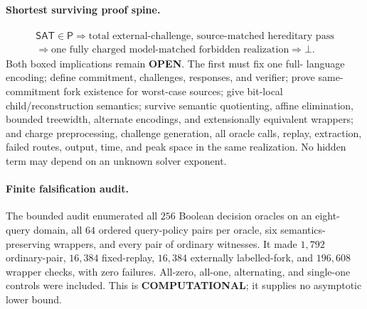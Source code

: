\documentclass[11pt]{article}
\newcommand{\statusopen}{\textcolor{openstatus}{\textbf{OPEN}}}
\begin{document}
\paragraph{Shortest surviving proof spine.}
\[
\begin{gathered}
\mathsf{SAT}\in\mathsf P
\Longrightarrow
\boxed{\text{total external-challenge, source-matched hereditary pass}}\\
\Longrightarrow
\boxed{\text{one fully charged model-matched forbidden realization}}
\Longrightarrow\bot .
\end{gathered}
\]
Both boxed implications remain \statusopen.  The first must fix one full-
language encoding; define commitment, challenges, responses, and verifier;
prove same-commitment fork existence for worst-case sources; give bit-local
child/reconstruction semantics; survive semantic quotienting, affine
elimination, bounded treewidth, alternate encodings, and extensionally
equivalent wrappers; and charge preprocessing, challenge generation, all
oracle calls, replay, extraction, failed routes, output, time, and peak space
in the same realization.  No hidden term may depend on an unknown solver
exponent.

\paragraph{Finite falsification audit.}
The bounded audit enumerated all $256$ Boolean decision oracles on an
eight-query domain, all $64$ ordered query-policy pairs per oracle, six
semantics-preserving wrappers, and every pair of ordinary witnesses.  It made
$1{,}792$ ordinary-pair, $16{,}384$ fixed-replay, $16{,}384$ externally
labelled-fork, and $196{,}608$ wrapper checks, with zero failures.  All-zero,
all-one, alternating, and single-one controls were included.  This is
\textbf{COMPUTATIONAL}; it supplies no asymptotic lower bound.
\end{document}

